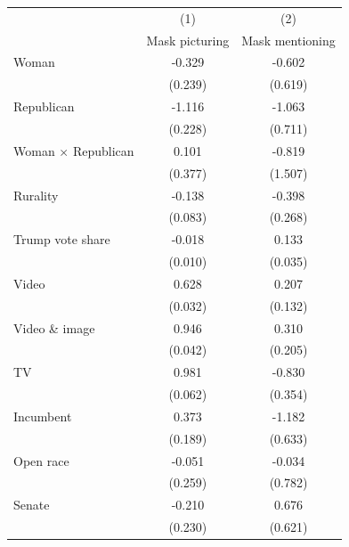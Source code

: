 \begin{tabular}{l*{2}{c}}
\toprule
                    &\multicolumn{1}{c}{(1)}&\multicolumn{1}{c}{(2)}\\
                    &\multicolumn{1}{c}{Mask picturing}&\multicolumn{1}{c}{Mask mentioning}\\
\midrule
Woman  &      -0.329         &      -0.602         \\
                    &     (0.239)         &     (0.619)         \\
Republican     &      -1.116\sym{***}&      -1.063         \\
                    &     (0.228)         &     (0.711)         \\
Woman $\times$ Republican&       0.101         &      -0.819         \\
                    &     (0.377)         &     (1.507)         \\
Rurality      &      -0.138         &      -0.398         \\
                    &     (0.083)         &     (0.268)         \\
Trump vote share              &      -0.018         &       0.133\sym{***}\\
                    &     (0.010)         &     (0.035)         \\
Video              &       0.628\sym{***}&       0.207         \\
                    &     (0.032)         &     (0.132)         \\
Video \& image         &       0.946\sym{***}&       0.310         \\
                    &     (0.042)         &     (0.205)         \\
TV                  &       0.981\sym{***}&      -0.830\sym{*}  \\
                    &     (0.062)         &     (0.354)         \\
Incumbent                   &       0.373\sym{*}  &      -1.182         \\
                    &     (0.189)         &     (0.633)         \\
Open race                   &      -0.051         &      -0.034         \\
                    &     (0.259)         &     (0.782)         \\
Senate              &      -0.210         &       0.676         \\
                    &     (0.230)         &     (0.621)         \\

\end{tabular}
